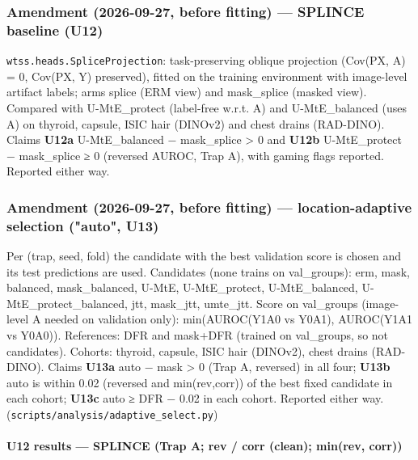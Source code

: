 {\subsubsection{Amendment (2026-09-27, before fitting) --- SPLINCE baseline (U12)}\label{amendment-2026-09-27-before-fitting--splince-baseline-u12}

\texttt{wtss.heads.SpliceProjection}: task-preserving oblique projection (Cov(PX, A) = 0, Cov(PX, Y) preserved), fitted
on the training environment with image-level artifact labels; arms splice (ERM view) and mask\_splice (masked
view). Compared with U-MtE\_protect (label-free w.r.t. A) and U-MtE\_balanced (uses A) on thyroid, capsule, ISIC hair
(DINOv2) and chest drains (RAD-DINO). Claims \textbf{U12a} U-MtE\_balanced − mask\_splice \textgreater{} 0 and \textbf{U12b}
U-MtE\_protect − mask\_splice ≥ 0 (reversed AUROC, Trap A), with gaming flags reported. Reported either way.

\subsubsection{Amendment (2026-09-27, before fitting) --- location-adaptive selection ("auto", U13)}\label{amendment-2026-09-27-before-fitting--location-adaptive-selection-auto-u13}

Per (trap, seed, fold) the candidate with the best validation score is chosen and its test predictions are used.
Candidates (none trains on val\_groups): erm, mask, balanced, mask\_balanced, U-MtE, U-MtE\_protect, U-MtE\_balanced,
U-MtE\_protect\_balanced, jtt, mask\_jtt, umte\_jtt. Score on val\_groups (image-level A needed on validation only):
min(AUROC(Y1A0 vs Y0A1), AUROC(Y1A1 vs Y0A0)). References: DFR and mask+DFR (trained on val\_groups, so not
candidates). Cohorts: thyroid, capsule, ISIC hair (DINOv2), chest drains (RAD-DINO).
Claims \textbf{U13a} auto − mask \textgreater{} 0 (Trap A, reversed) in all four; \textbf{U13b} auto is within 0.02 (reversed and
min(rev,corr)) of the best fixed candidate in each cohort; \textbf{U13c} auto ≥ DFR − 0.02 in each cohort.
Reported either way. (\texttt{scripts/analysis/adaptive\_select.py})

\paragraph{U12 results --- SPLINCE (Trap A; rev / corr (clean); min(rev, corr))}\label{u12-results--splince-trap-a-rev--corr-clean-minrev-corr}

}
